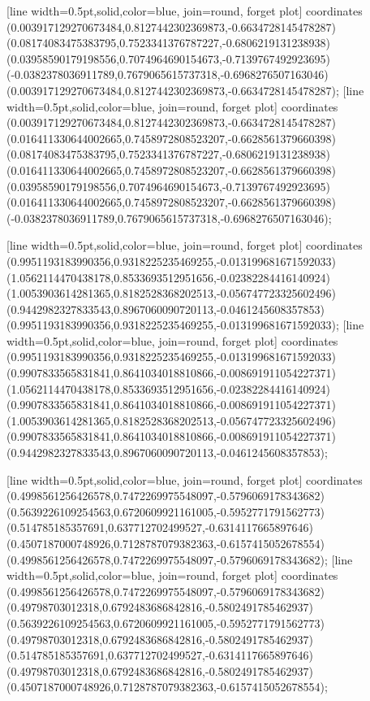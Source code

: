 [line width=0.5pt,solid,color=blue, join=round, forget plot] coordinates {(0.003917129270673484,0.8127442302369873,-0.6634728145478287) (0.08174083475383795,0.7523341376787227,-0.6806219131238938) (0.03958590179198556,0.7074964690154673,-0.7139767492923695) (-0.0382378036911789,0.7679065615737318,-0.6968276507163046) (0.003917129270673484,0.8127442302369873,-0.6634728145478287)};
[line width=0.5pt,solid,color=blue, join=round, forget plot] coordinates {(0.003917129270673484,0.8127442302369873,-0.6634728145478287) (0.016411330644002665,0.7458972808523207,-0.6628561379660398) (0.08174083475383795,0.7523341376787227,-0.6806219131238938) (0.016411330644002665,0.7458972808523207,-0.6628561379660398) (0.03958590179198556,0.7074964690154673,-0.7139767492923695) (0.016411330644002665,0.7458972808523207,-0.6628561379660398) (-0.0382378036911789,0.7679065615737318,-0.6968276507163046)};

[line width=0.5pt,solid,color=blue, join=round, forget plot] coordinates {(0.9951193183990356,0.9318225235469255,-0.013199681671592033) (1.0562114470438178,0.8533693512951656,-0.02382284416140924) (1.0053903614281365,0.8182528368202513,-0.056747723325602496) (0.9442982327833543,0.8967060090720113,-0.0461245608357853) (0.9951193183990356,0.9318225235469255,-0.013199681671592033)};
[line width=0.5pt,solid,color=blue, join=round, forget plot] coordinates {(0.9951193183990356,0.9318225235469255,-0.013199681671592033) (0.9907833565831841,0.8641034018810866,-0.008691911054227371) (1.0562114470438178,0.8533693512951656,-0.02382284416140924) (0.9907833565831841,0.8641034018810866,-0.008691911054227371) (1.0053903614281365,0.8182528368202513,-0.056747723325602496) (0.9907833565831841,0.8641034018810866,-0.008691911054227371) (0.9442982327833543,0.8967060090720113,-0.0461245608357853)};

[line width=0.5pt,solid,color=blue, join=round, forget plot] coordinates {(0.4998561256426578,0.7472269975548097,-0.5796069178343682) (0.5639226109254563,0.6720609921161005,-0.5952771791562773) (0.514785185357691,0.637712702499527,-0.6314117665897646) (0.4507187000748926,0.7128787079382363,-0.6157415052678554) (0.4998561256426578,0.7472269975548097,-0.5796069178343682)};
[line width=0.5pt,solid,color=blue, join=round, forget plot] coordinates {(0.4998561256426578,0.7472269975548097,-0.5796069178343682) (0.49798703012318,0.6792483686842816,-0.5802491785462937) (0.5639226109254563,0.6720609921161005,-0.5952771791562773) (0.49798703012318,0.6792483686842816,-0.5802491785462937) (0.514785185357691,0.637712702499527,-0.6314117665897646) (0.49798703012318,0.6792483686842816,-0.5802491785462937) (0.4507187000748926,0.7128787079382363,-0.6157415052678554)};

